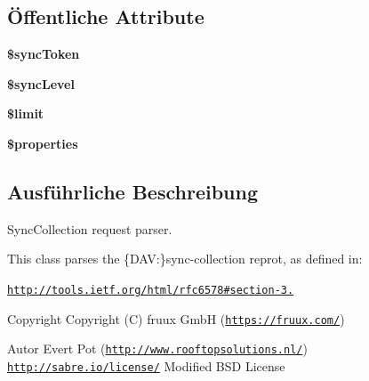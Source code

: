 \subsection*{Öffentliche Attribute}
\begin{DoxyCompactItemize}
\item 
\mbox{\label{class_sabre_1_1_d_a_v_1_1_xml_1_1_request_1_1_sync_collection_report_a105be8d73f84898700797b6611b339cf}} 
{\bfseries \$sync\+Token}
\item 
\mbox{\label{class_sabre_1_1_d_a_v_1_1_xml_1_1_request_1_1_sync_collection_report_a8b27a10211b76d1f96efe40a55e254e8}} 
{\bfseries \$sync\+Level}
\item 
\mbox{\label{class_sabre_1_1_d_a_v_1_1_xml_1_1_request_1_1_sync_collection_report_a5e69aa9f2d10650fb83fe8780d04ec94}} 
{\bfseries \$limit}
\item 
\mbox{\label{class_sabre_1_1_d_a_v_1_1_xml_1_1_request_1_1_sync_collection_report_a32989cb5ba41ed3891b00f4c12845c74}} 
{\bfseries \$properties}
\end{DoxyCompactItemize}


\subsection{Ausführliche Beschreibung}
Sync\+Collection request parser.

This class parses the \{D\+AV\+:\}sync-\/collection reprot, as defined in\+:

\href{http://tools.ietf.org/html/rfc6578#section-3.2}{\tt http\+://tools.\+ietf.\+org/html/rfc6578\#section-\/3.}

\begin{DoxyCopyright}{Copyright}
Copyright (C) fruux GmbH (\href{https://fruux.com/}{\tt https\+://fruux.\+com/}) 
\end{DoxyCopyright}
\begin{DoxyAuthor}{Autor}
Evert Pot (\href{http://www.rooftopsolutions.nl/}{\tt http\+://www.\+rooftopsolutions.\+nl/})  \href{http://sabre.io/license/}{\tt http\+://sabre.\+io/license/} Modified B\+SD License 
\end{DoxyAuthor}



